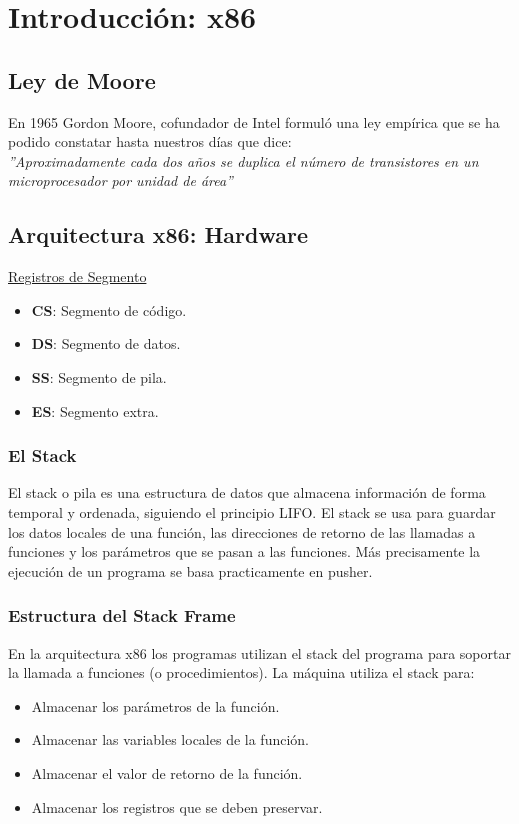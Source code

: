 \documentclass[../main.tex]{subfiles}
\begin{document}
\section{Introducción: x86}

\subsection{Ley de Moore}
    En 1965 Gordon Moore, cofundador de Intel formuló una ley empírica que se ha podido constatar hasta nuestros días que dice:\\

    \textit{”Aproximadamente cada dos años se duplica el número de transistores en un microprocesador por unidad de área”}

\subsection{Arquitectura x86: Hardware}
    \underline{Registros de Segmento}
    \begin{itemize}
        \item \textbf{CS}: Segmento de código.
        \item \textbf{DS}: Segmento de datos.
        \item \textbf{SS}: Segmento de pila.
        \item \textbf{ES}: Segmento extra.
    \end{itemize}

    \subsubsection{El Stack}
        El stack o pila es una estructura de datos que almacena información de forma temporal y ordenada, siguiendo el principio LIFO. El stack se usa
        para guardar los datos locales de una función, las direcciones de retorno de las llamadas a funciones y los parámetros que se pasan a las funciones. Más precisamente la ejecución de un programa se basa practicamente en pusher.

    \subsubsection{Estructura del Stack Frame}
        En la arquitectura x86 los programas utilizan el stack del programa para soportar la llamada a funciones (o procedimientos). La máquina utiliza el stack para:
        
        \begin{itemize}
            \item Almacenar los parámetros de la función.
            \item Almacenar las variables locales de la función.
            \item Almacenar el valor de retorno de la función.
            \item Almacenar los registros que se deben preservar.
        \end{itemize}
\end{document}

